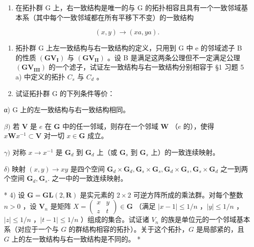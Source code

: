 \BourbakiExerciseGroup

\begin{enumerate}
\def\labelenumi{\arabic{enumi})}
\tightlist
\item
  在拓扑群 G 上，右一致结构是唯一的与 G 的拓扑相容且具有一个一致邻域基本系（其中每个一致邻域都在所有平移下不变）的一致结构
\end{enumerate}

\[
(x, y) \rightarrow (x a, y a).
\]

\begin{enumerate}
\def\labelenumi{\arabic{enumi})}
\setcounter{enumi}{1}
\item
  拓扑群 G 上左一致结构与右一致结构的定义，只用到 G 中 e 的邻域滤子 B 的性质 \((\mathbf{GV}_{\mathbf{I}})\) 与 \((\mathbf{GV}_{\mathbf{II}})\) 。设 B 是满足这两条公理但不一定满足公理 \((\mathbf{GV}_{\mathbf{III}})\) 的一个滤子，试证左一致结构与右一致结构分别相容于 §1 习题 5 a) 中定义的拓扑 \(C_{s}\) 与 \(C_{d}\) 。
\item
  试证拓扑群 G 的下列条件等价：
\end{enumerate}

α) G 上的左一致结构与右一致结构相同。

\(\beta)\) 若 \(\mathbf{V}\) 是 \(e\) 在 \(\mathbf{G}\) 中的任一邻域，则存在一个邻域 \(\mathbf{W}\) （\(e\) 的），使得 \(x\mathbf{W}x^{-1} \subset \mathbf{V}\) 对一切 \(x \in \mathbf{G}\) 成立。

\(\gamma)\) 对称 \(x \to x^{-1}\) 是 \(\mathbf{G}_d\) 到 \(\mathbf{G}_d\) 上（或 \(\mathbf{G}_s\) 到 \(\mathbf{G}_s\) 上）的一致连续映射。

\(\delta)\) 映射 \((x,y)\to xy\) 是四个空间 \(\mathbf{G}_d\times \mathbf{G}_d,\mathbf{G}_s\times \mathbf{G}_s,\mathbf{G}_d\times \mathbf{G}_s,\mathbf{G}_s\times \mathbf{G}_d\) 之一到两个空间 \(\mathbf{G}_d,\mathbf{G}_s.\) 之一中的一致连续映射。

* 4) 设 \(\mathbf{G} = \mathbf{GL}(2, \mathbf{R})\) 是实元素的 \(2 \times 2\) 可逆方阵所成的乘法群。对每个整数 \(n > 0\) ，设 \(\mathbf{V}_n\) 是矩阵 \(X = \begin{pmatrix} x & y \\ z & t \end{pmatrix} \in \mathbf{G}\) （满足 \(|x - 1| \leqslant 1/n\) ，\(|y| \leqslant 1/n\) ，\(|z| \leqslant 1/n\) ，\(|t - 1| \leqslant 1/n\) ）组成的集合。试证诸 \(V_n\) 的族是单位元的一个邻域基本系（对应于一个与 \(G\) 的群结构相容的拓扑）。关于这个拓扑，\(G\) 是局部紧的，且 \(G\) 上的左一致结构与右一致结构是不同的。 *

